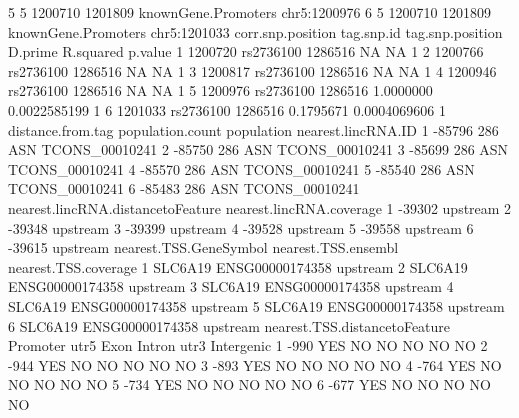 \documentclass[12pt,fullpage]{article}
\begin{document}
\begin{Schunk}
\begin{Soutput}
5          5           1200710         1201809 knownGene.Promoters chr5:1200976
6          5           1200710         1201809 knownGene.Promoters chr5:1201033
  corr.snp.position tag.snp.id tag.snp.position   D.prime    R.squared p.value
1           1200720  rs2736100          1286516        NA           NA       1
2           1200766  rs2736100          1286516        NA           NA       1
3           1200817  rs2736100          1286516        NA           NA       1
4           1200946  rs2736100          1286516        NA           NA       1
5           1200976  rs2736100          1286516 1.0000000 0.0022585199       1
6           1201033  rs2736100          1286516 0.1795671 0.0004069606       1
  distance.from.tag population.count population nearest.lincRNA.ID
1            -85796              286        ASN     TCONS_00010241
2            -85750              286        ASN     TCONS_00010241
3            -85699              286        ASN     TCONS_00010241
4            -85570              286        ASN     TCONS_00010241
5            -85540              286        ASN     TCONS_00010241
6            -85483              286        ASN     TCONS_00010241
  nearest.lincRNA.distancetoFeature nearest.lincRNA.coverage
1                            -39302                 upstream
2                            -39348                 upstream
3                            -39399                 upstream
4                            -39528                 upstream
5                            -39558                 upstream
6                            -39615                 upstream
  nearest.TSS.GeneSymbol nearest.TSS.ensembl nearest.TSS.coverage
1                SLC6A19     ENSG00000174358             upstream
2                SLC6A19     ENSG00000174358             upstream
3                SLC6A19     ENSG00000174358             upstream
4                SLC6A19     ENSG00000174358             upstream
5                SLC6A19     ENSG00000174358             upstream
6                SLC6A19     ENSG00000174358             upstream
  nearest.TSS.distancetoFeature Promoter utr5 Exon Intron utr3 Intergenic
1                          -990      YES   NO   NO     NO   NO         NO
2                          -944      YES   NO   NO     NO   NO         NO
3                          -893      YES   NO   NO     NO   NO         NO
4                          -764      YES   NO   NO     NO   NO         NO
5                          -734      YES   NO   NO     NO   NO         NO
6                          -677      YES   NO   NO     NO   NO         NO
\end{Soutput}

\end{Schunk}
\end{document}
